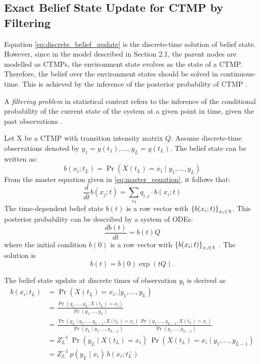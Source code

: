 \subsection{Exact Belief State Update for CTMP by Filtering}
\label{sec:filtering_CTMC}
Equation \ref{eq:discrete_belief_update} is the discrete-time solution of belief state. However, since in the model described in Section 2.1, the parent nodes are modelled as CTMPs, the environment state evolves as the state of a CTMP. Therefore, the belief over the environment states should be solved in continuous-time. This is achieved by the inference of the posterior probability of CTMP \cite{article}.\par
A \textit{filtering problem} in statistical context refers to the inference of the conditional probability of the current state of the system at a given point in time, given the past observations \cite{Godsill2019}.\par
Let X be a CTMP with transition intensity matrix $ Q $. Assume discrete-time observations denoted by $ y_{1}=y(t_{1}), ..., y_{L}=y(t_{L}) $. The belief state can be written as:
\begin{equation}
b(x_{i};t_{L}) = \operatorname{Pr}(X(t_{L}) = x_{i} \mid y_{1}, ..., y_{L})
\end{equation}
From the master equation given in \autoref{eq:master_equation}, it follows that:
\begin{equation}
\frac{d}{dt} b(x_{j};t)  = \sum_{\forall i} q_{i,j} \cdot b(x_{i};t)
\end{equation}
The time-dependent belief state $ b(t) $ is a row vector with $ \left\lbrace b(x_{i};t)\right\rbrace_{x_{i} \in \rchi}  $.
This posterior probability can be described by a system of ODEs:
\begin{equation}
\frac{db(t)}{dt} = b(t)Q
\end{equation}
where the initial condition $ b(0) $ is a row vector with $ \left\lbrace b(x_{i};t)\right\rbrace_{x_{i} \in \rchi} $ \cite{article}. The solution is
\begin{equation}
b(t) = b(0) \exp(tQ).
\label{eq:b_cont}
\end{equation}\par
The belief state update at discrete times of observation $ y_{t} $ is derived as 
\begin{align}
b(x_{i}; t_{L}) & = \operatorname{Pr}( X(t_{L}) = x_{i},\mid y_{1}, ..., y_{L}) \nonumber\\ & = \frac{\operatorname{Pr}(y_{1}, ..., y_{L}, X(t_{L}) = x_{i})}{\operatorname{Pr}(y_{1}, ..., y_{L})}  \nonumber\\ & = \frac{\operatorname{Pr}(y_{L} \mid y_{1}, ..., y_{L-1}, X(t_{L}) = x_{i})}{\operatorname{Pr}(y_{L} \mid y_{1}, ..., y_{L-1})} \frac{\operatorname{Pr}(y_{1}, ..., y_{L-1}, X(t_{L}) = x_{i})}{\operatorname{Pr}(y_{1}, ..., y_{L-1})}  \nonumber\\ & = Z_{L}^{-1} \ \operatorname{Pr}(y_{L} \mid X(t_{L})=x_{i})\ \operatorname{Pr}( X(t_{L}) = x_{i}\mid y_{1}, ..., y_{L-1})  \nonumber\\ & = Z_{L}^{-1}\ {p(y_{L} \mid x_{i})}\ {b(x_{i}; t_{L}^{-})}
\label{eq:b_jump}
\end{align}
